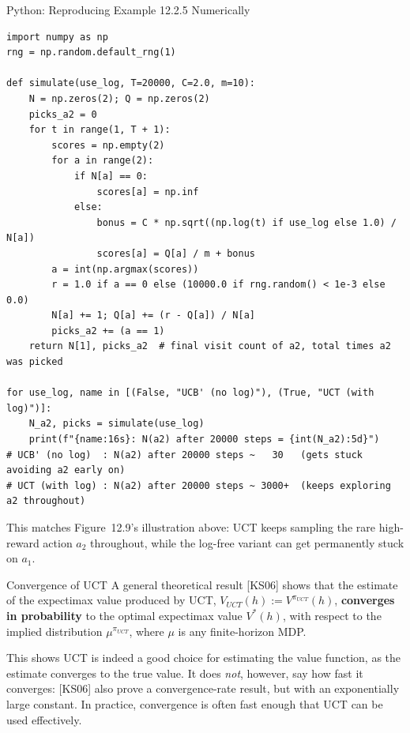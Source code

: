 \documentclass[aspectratio=169,10pt]{beamer}
\begin{document}
\begin{frame}[fragile]{Python: Reproducing Example 12.2.5 Numerically}
\begin{lstlisting}
import numpy as np
rng = np.random.default_rng(1)

def simulate(use_log, T=20000, C=2.0, m=10):
    N = np.zeros(2); Q = np.zeros(2)
    picks_a2 = 0
    for t in range(1, T + 1):
        scores = np.empty(2)
        for a in range(2):
            if N[a] == 0:
                scores[a] = np.inf
            else:
                bonus = C * np.sqrt((np.log(t) if use_log else 1.0) / N[a])
                scores[a] = Q[a] / m + bonus
        a = int(np.argmax(scores))
        r = 1.0 if a == 0 else (10000.0 if rng.random() < 1e-3 else 0.0)
        N[a] += 1; Q[a] += (r - Q[a]) / N[a]
        picks_a2 += (a == 1)
    return N[1], picks_a2  # final visit count of a2, total times a2 was picked

for use_log, name in [(False, "UCB' (no log)"), (True, "UCT (with log)")]:
    N_a2, picks = simulate(use_log)
    print(f"{name:16s}: N(a2) after 20000 steps = {int(N_a2):5d}")
# UCB' (no log)  : N(a2) after 20000 steps ~   30   (gets stuck avoiding a2 early on)
# UCT (with log) : N(a2) after 20000 steps ~ 3000+  (keeps exploring a2 throughout)
\end{lstlisting}
This matches Figure~12.9's illustration above: UCT keeps sampling the rare high-reward
action $a_2$ throughout, while the log-free variant can get permanently stuck on $a_1$.
\end{frame}

\begin{frame}{Convergence of UCT}
A general theoretical result [KS06] shows that the estimate of the expectimax value
produced by UCT, $V_{UCT}(h):=V^{\pi_{UCT}}(h)$, \textbf{converges in probability} to the
optimal expectimax value $V^*(h)$, with respect to the implied distribution
$\mu^{\pi_{UCT}}$, where $\mu$ is any finite-horizon MDP.

This shows UCT is indeed a good choice for estimating the value function, as the estimate
converges to the true value. It does \emph{not}, however, say how fast it converges: [KS06]
also prove a convergence-rate result, but with an exponentially large constant. In
practice, convergence is often fast enough that UCT can be used effectively.
\end{frame}
\end{document}
